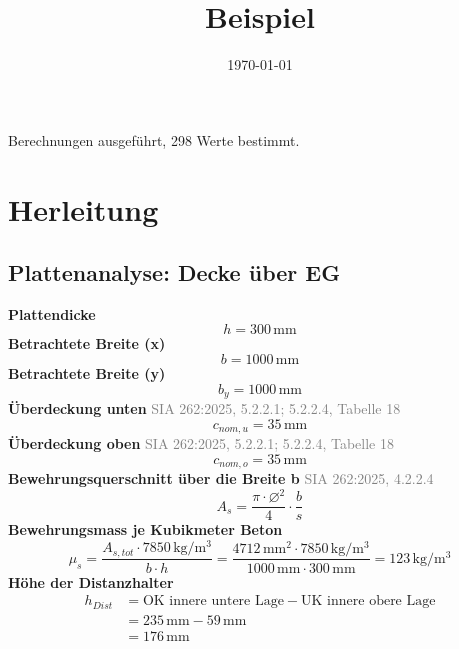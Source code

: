 \documentclass[11pt,a4paper]{article}
\title{Beispiel}
\author{}
\date{\today}
\newcommand{\normref}[1]{{\small\textcolor{gray}{#1}}}
\begin{document}
 Berechnungen ausgeführt, 298 Werte bestimmt.

\section{Herleitung}
\subsection{Plattenanalyse: Decke über EG}
\noindent\textbf{Plattendicke}
\begin{equation*}
h = 300\,\mathrm{mm}
\end{equation*}
\noindent\textbf{Betrachtete Breite (x)}
\begin{equation*}
b = 1000\,\mathrm{mm}
\end{equation*}
\noindent\textbf{Betrachtete Breite (y)}
\begin{equation*}
b_y = 1000\,\mathrm{mm}
\end{equation*}
\noindent\textbf{Überdeckung unten} \hfill \normref{SIA 262:2025, 5.2.2.1; 5.2.2.4, Tabelle 18}
\begin{equation*}
c_{nom,u} = 35\,\mathrm{mm}
\end{equation*}
\noindent\textbf{Überdeckung oben} \hfill \normref{SIA 262:2025, 5.2.2.1; 5.2.2.4, Tabelle 18}
\begin{equation*}
c_{nom,o} = 35\,\mathrm{mm}
\end{equation*}
\noindent\textbf{Bewehrungsquerschnitt über die Breite b} \hfill \normref{SIA 262:2025, 4.2.2.4}
\begin{equation*}
A_s = \frac{\pi \cdot \varnothing^{2}}{4} \cdot \frac{b}{s}
\end{equation*}
\noindent\textbf{Bewehrungsmass je Kubikmeter Beton}
\begin{equation*}
\mu_s = \frac{A_{s,tot} \cdot 7850\,\mathrm{kg}/\mathrm{m}^{3}}{b \cdot h} = \frac{4712\,\mathrm{mm}^{2} \cdot 7850\,\mathrm{kg}/\mathrm{m}^{3}}{1000\,\mathrm{mm} \cdot 300\,\mathrm{mm}} = 123\,\mathrm{kg}/\mathrm{m}^{3}
\end{equation*}
\noindent\textbf{Höhe der Distanzhalter}
\begin{equation*}
\begin{aligned}
  h_{Dist} &= \text{OK innere untere Lage} - \text{UK innere obere Lage} \\
  &= 235\,\mathrm{mm} - 59\,\mathrm{mm} \\
  &= 176\,\mathrm{mm}
\end{aligned}
\end{equation*}
\end{document}
